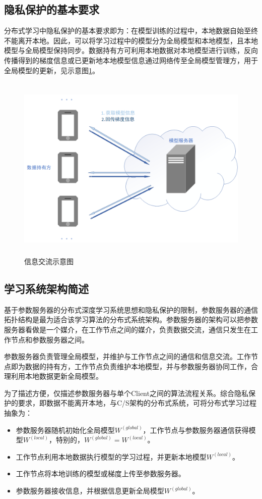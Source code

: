 \documentclass[zihao = -4,cn]{oucart}
\begin{document}
\subsection{隐私保护的基本要求}
分布式学习中隐私保护的基本要求即为：在模型训练的过程中，本地数据自始至终不能离开本地。因此，可以将学习过程中的模型分为全局模型和本地模型，且本地模型与全局模型保持同步。数据持有方可利用本地数据对本地模型进行训练，反向传播得到的梯度信息或已更新地本地模型信息通过网络传至全局模型管理方，用于全局模型的更新，见示意图\ref{fig:commu}。
\begin{figure}[h]
\centering %
\includegraphics[width=15cm,height=9cm]{assets/test}
\caption{信息交流示意图}
\label{fig:commu}
\end{figure}

\subsection{学习系统架构简述}
基于参数服务器的分布式深度学习系统思想和隐私保护的限制，参数服务器的通信拓扑结构是最为适合该学习算法的分布式系统架构。参数服务器的架构可以把参数服务器看做是一个媒介，在工作节点之间的媒介，负责数据交流，通信只发生在工作节点和参数服务器之间。\par
参数服务器负责管理全局模型，并维护与工作节点之间的通信和信息交流。工作节点即为数据的持有方，工作节点负责维护本地模型，并与参数服务器协同工作，合理利用本地数据更新全局模型。\par
为了描述方便，仅描述参数服务器与单个Client之间的算法流程关系。综合隐私保护的要求，即数据不能离开本地，与C/S架构的分布式系统，可将分布式学习过程抽象为：
\begin{itemize}
	\item [1)]
	参数服务器随机初始化全局模型$W^{(global)}$，工作节点与参数服务器通信获得模型$W^{(local)}$，特别的，$W^{(global)} = W^{(local)}$。
	\item [2)]
	工作节点利用本地数据执行模型的学习过程，并更新本地模型$W^{(local)}$。
	\item [3)]
	工作节点将本地训练的模型或梯度上传至参数服务器。
	\item [4)]
	参数服务器接收信息，并根据信息更新全局模型$W^{(global)}$。\par
\end{itemize}
\end{document}
